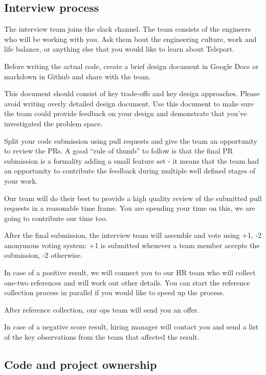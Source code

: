 \documentclass{article}
\begin{document}
\subsection{Interview process}

The interview team joins the slack channel. The team consists of the engineers who will be working with you.
Ask them bout the engineering culture, work and life balance, or anything else that you would like to learn about Teleport.

Before writing the actual code, create a brief design document in Google Docs or markdown in Github and share with the team.

This document should consist of key trade-offs and key design approaches. Please avoid writing overly detailed design document. Use this document to make sure the team could provide feedback on your design and demonstrate that you've investigated the problem space.

Split your code submission using pull requests and give the team an opportunity to review the PRs. A good “rule of thumb” to follow is that the final PR submission is a formality adding a small feature set - it means that the team had an opportunity to contribute the feedback during multiple well defined stages of your work.

Our team will do their best to provide a high quality review of the submitted pull requests in a reasonable time frame. You are spending your time on this, we are going to contribute our time too.

After the final submission, the interview team will assemble and vote using +1, -2 anonymous voting system: +1 is submitted whenever a team member accepts the submission, -2 otherwise.

In case of a positive result, we will connect you to our HR team who will collect one-two references and will work out other details. You can start the reference collection process in parallel if you would like to speed up the process.

After reference collection, our ops team will send you an offer.

In case of a negative score result, hiring manager will contact you and send a list of the key observations from the team that affected the result.

\subsection{Code and project ownership}
\end{document}
